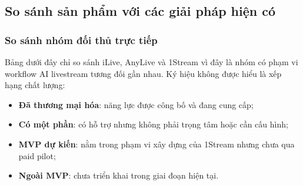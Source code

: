 \subsection{So sánh sản phẩm với các giải pháp hiện có}

\subsubsection{So sánh nhóm đối thủ trực tiếp}

Bảng dưới đây chỉ so sánh iLive, AnyLive và 1Stream vì đây là nhóm có phạm vi
workflow AI livestream tương đối gần nhau. Ký hiệu không được hiểu là xếp hạng
chất lượng:
\begin{itemize}
    \item \textbf{Đã thương mại hóa}: năng lực được công bố và đang cung cấp;
    \item \textbf{Có một phần}: có hỗ trợ nhưng không phải trọng tâm hoặc cần cấu hình;
    \item \textbf{MVP dự kiến}: nằm trong phạm vi xây dựng của 1Stream nhưng chưa qua paid pilot;
    \item \textbf{Ngoài MVP}: chưa triển khai trong giai đoạn hiện tại.
\end{itemize}

